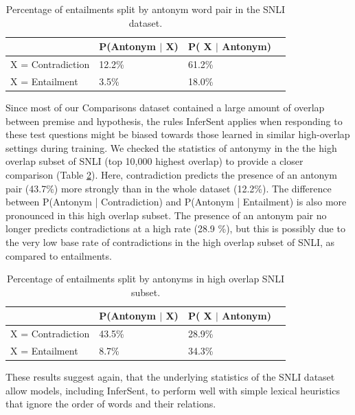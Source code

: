 \begin{table}[htb]
   \begin{tabular}{llll}
  \toprule
    & P(Antonym $|$ X) & P( X $|$ Antonym) \\
    \midrule
    X = Contradiction & 12.2\% & 61.2\% \\
      X = Entailment &  3.5\% &  18.0\% \\
\bottomrule 
  \end{tabular}
 \caption{ Percentage of entailments split by antonym word pair in the SNLI dataset. 
}
  \label{tab:antonyms}
\end{table}

Since most of our Comparisons dataset contained a large amount of overlap between premise and hypothesis, the rules InferSent applies when responding to these test questions might be biased towards those learned in similar high-overlap settings during training. We checked the statistics of antonymy in the the high overlap subset of SNLI (top 10,000 highest overlap) to provide a closer comparison (Table \ref{tab:antonyms-ho}). Here, contradiction predicts the presence of an antonym pair (43.7\%) more strongly than in the whole dataset (12.2\%). The difference between P(Antonym | Contradiction) and P(Antonym | Entailment) is also more pronounced in this high overlap subset. The presence of an antonym pair no longer predicts contradictions at a high rate (28.9 \%), but this is possibly due to the very low base rate of contradictions in the high overlap subset of SNLI, as compared to entailments.
 
\begin{table}[htb]
  \begin{tabular}{llll}
  \toprule
    & P(Antonym $|$ X) & P( X $|$ Antonym) \\
    \midrule
    X = Contradiction & 43.5\% & 28.9\% \\
      X = Entailment &  8.7\% &  34.3\% \\
\bottomrule 
  \end{tabular}
 \caption{ Percentage of entailments split by antonyms in high overlap SNLI subset.}
  \label{tab:antonyms-ho}
\end{table}
 
These results suggest again, that the underlying statistics of the SNLI dataset allow models, including InferSent, to perform well with simple lexical heuristics that ignore the order of words and their relations.

